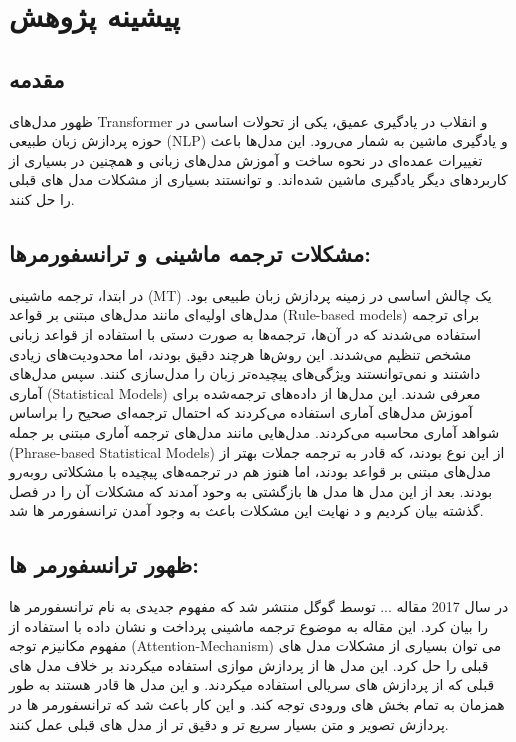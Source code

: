 \chapter{پیشینه پژوهش}

\section{مقدمه}
ظهور مدل‌های Transformer و انقلاب در یادگیری عمیق، یکی از تحولات اساسی در حوزه پردازش زبان طبیعی (NLP) و یادگیری ماشین به شمار می‌رود. این مدل‌ها باعث تغییرات عمده‌ای در نحوه ساخت و آموزش مدل‌های زبانی و همچنین در بسیاری از کاربردهای دیگر یادگیری ماشین شده‌اند. و توانستند بسیاری از مشکلات مدل های قبلی را حل کنند.

\section{مشکلات ترجمه ماشینی و ترانسفورمرها:}
در ابتدا، ترجمه ماشینی (MT) یک چالش اساسی در زمینه پردازش زبان طبیعی بود. مدل‌های اولیه‌ای مانند مدل‌های مبتنی بر قواعد (Rule-based models) برای ترجمه استفاده می‌شدند که در آن‌ها، ترجمه‌ها به صورت دستی با استفاده از قواعد زبانی مشخص تنظیم می‌شدند.
این روش‌ها هرچند دقیق بودند، اما محدودیت‌های زیادی داشتند و نمی‌توانستند ویژگی‌های پیچیده‌تر زبان را مدل‌سازی کنند.
سپس مدل‌های آماری (Statistical Models) معرفی شدند. این مدل‌ها از داده‌های ترجمه‌شده برای آموزش مدل‌های آماری استفاده می‌کردند که احتمال ترجمه‌ای صحیح را براساس شواهد آماری محاسبه می‌کردند. مدل‌هایی مانند مدل‌های ترجمه آماری مبتنی بر جمله (Phrase-based Statistical Models) از این نوع بودند، که قادر به ترجمه جملات بهتر از مدل‌های مبتنی بر قواعد بودند، اما هنوز هم در ترجمه‌های پیچیده با مشکلاتی روبه‌رو بودند.  بعد از این مدل ها مدل ها بازگشتی به وحود آمدند که مشکلات آن را در فصل گذشته بیان کردیم و د نهایت این مشکلات باعث به وجود آمدن ترانسفورمر ها شد.

\section{ظهور ترانسفورمر ها:}
در سال 2017 مقاله ... توسط گوگل منتشر شد که مفهوم جدیدی به نام ترانسفورمر ها را بیان کرد.
این مقاله به موضوع ترجمه ماشینی پرداخت و نشان داده با استفاده از مفهوم مکانیزم توجه (Attention-Mechanism) می توان بسیاری از مشکلات مدل های قبلی را حل کرد.
این مدل ها از پردازش موازی استفاده میکردند بر خلاف مدل های قبلی که از پردازش های سریالی استفاده میکردند. و این مدل ها قادر هستند به طور همزمان به تمام بخش های ورودی توجه کند.
و این کار باعث شد که ترانسفورمر ها در پردازش تصویر و متن بسیار سریع تر و دقیق تر از مدل های قبلی عمل کنند.


